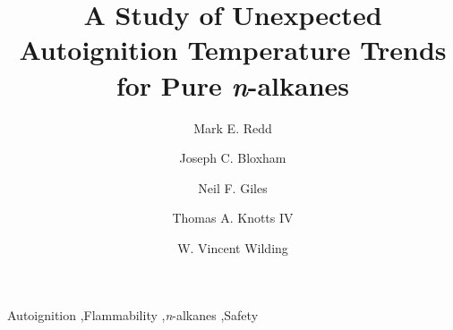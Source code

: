 \documentclass{elsarticle}
\begin{document}
\begin{frontmatter}

\title{A Study of Unexpected Autoignition Temperature Trends for Pure \textit{n}-alkanes}


\author[byu]{Mark E. Redd}
\author[byu]{Joseph C. Bloxham}
\author[dippr]{Neil F. Giles}
\author[byu]{Thomas A. Knotts IV}
\author[byu]{W. Vincent Wilding }

\address[byu]{Department of Chemical Engineering, Brigham Young University, Provo, Utah 84602, USA}
\address[dippr]{Design Institute for Physical Properties 801 Project, Provo, Utah 84602, USA}

\begin{abstract}

\end{abstract}

\begin{keyword}
Autoignition \sep Flammability \sep \textit{n}-alkanes \sep Safety
\end{keyword}

\end{frontmatter}

\linenumbers




\end{document}
